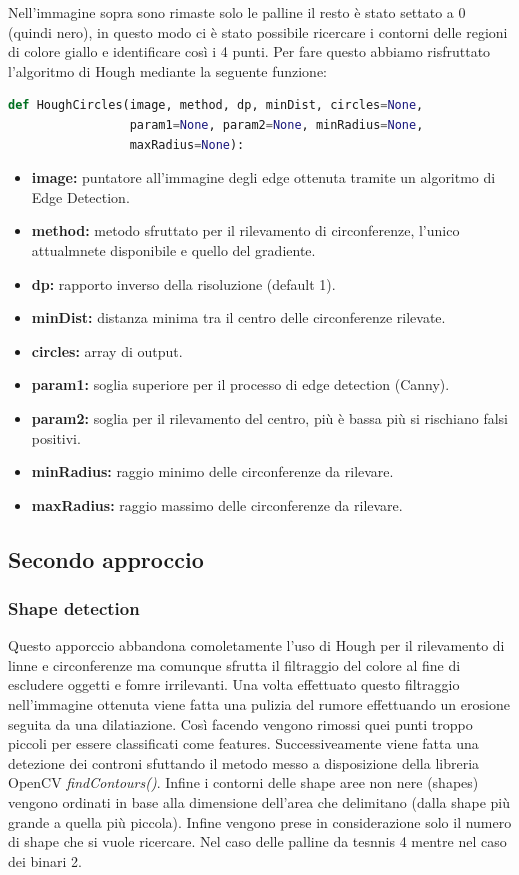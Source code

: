 \documentclass[twoside]{supsistudent}
\begin{document}
Nell'immagine sopra sono rimaste solo le palline il resto è stato settato a 0 (quindi nero), in questo modo ci è stato possibile ricercare i contorni delle regioni di colore giallo e 
identificare così i 4 punti. Per fare questo abbiamo risfruttato l'algoritmo di Hough mediante la seguente funzione:
\begin{lstlisting}[language=Python]
def HoughCircles(image, method, dp, minDist, circles=None, 
                 param1=None, param2=None, minRadius=None, 
                 maxRadius=None):
\end{lstlisting}
\begin{itemize}
  \item \textbf{image:} puntatore all'immagine degli edge ottenuta tramite un algoritmo di 
  Edge Detection.
  \item \textbf{method:} metodo sfruttato per il rilevamento di circonferenze, 
  l'unico attualmnete disponibile e quello del gradiente.
  \item \textbf{dp:} rapporto inverso della risoluzione (default 1).
  \item \textbf{minDist:} distanza minima tra il centro delle circonferenze rilevate.
  \item \textbf{circles:} array di output.
  \item \textbf{param1:} soglia superiore per il processo di edge detection (Canny).
  \item \textbf{param2:} soglia per il rilevamento del centro, più è bassa più si 
  rischiano falsi positivi.
  \item \textbf{minRadius:} raggio minimo delle circonferenze da rilevare.
  \item \textbf{maxRadius:} raggio massimo delle circonferenze da rilevare.
\end{itemize}
\subsection{Secondo approccio}
\subsubsection{Shape detection}
Questo apporccio abbandona comoletamente l'uso di Hough per il rilevamento di linne e circonferenze ma comunque sfrutta il filtraggio del colore
al fine di escludere oggetti e fomre irrilevanti. Una volta effettuato questo filtraggio nell'immagine ottenuta viene fatta una pulizia del 
rumore effettuando un erosione seguita da una dilatiazione. Così facendo vengono rimossi quei punti troppo piccoli per essere classificati come features.
Successiveamente viene fatta una detezione dei controni sfuttando il metodo messo a disposizione della libreria OpenCV \textit{findContours()}. Infine i contorni delle 
shape aree non nere (shapes) vengono ordinati in base alla dimensione dell'area che delimitano (dalla shape più grande a quella più piccola). Infine vengono prese in 
considerazione solo il numero di shape che si vuole ricercare. Nel caso delle palline da tesnnis 4 mentre nel caso dei binari 2. 
\end{document}
